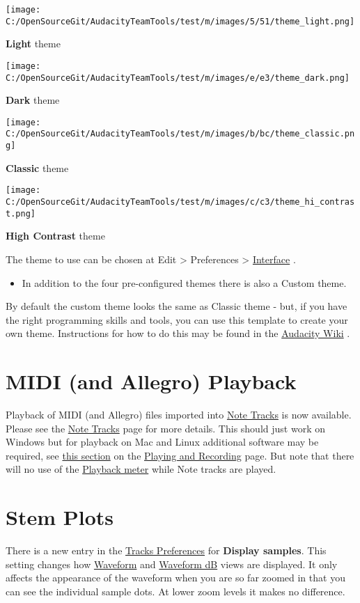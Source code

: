\begin{multicols}{2}
\par \texttt{[image: C:/OpenSourceGit/AudacityTeamTools/test/m/images/5/51/theme\_light.png]}\par 
\textbf{Light} theme

\par \texttt{[image: C:/OpenSourceGit/AudacityTeamTools/test/m/images/e/e3/theme\_dark.png]}\par 
\textbf{Dark} theme

\par \texttt{[image: C:/OpenSourceGit/AudacityTeamTools/test/m/images/b/bc/theme\_classic.png]}\par 
\textbf{Classic} theme

\par \texttt{[image: C:/OpenSourceGit/AudacityTeamTools/test/m/images/c/c3/theme\_hi\_contrast.png]}\par 
\textbf{High Contrast} theme


The theme to use can be chosen at Edit > Preferences > 
\hyperref[XXX\foo{interface_preferences_}]{Interface}
.  

\begin{itemize}
\item  In addition to the four pre-configured themes there is also a Custom theme.  
\end{itemize}
 By default the custom theme looks the same as Classic theme - but, if you have the right programming skills and tools, you can use this template to create your own theme.  Instructions for how to do this may be found in the 
\hyperref[XXX\foo{https:__wiki.audacityteam.org_wiki_Theming_HowTo}]{Audacity Wiki}
.
\section{MIDI (and Allegro) Playback}Playback of MIDI (and Allegro) files imported into 
\hyperref[XXX\foo{note_tracks_}]{Note Tracks}
 is now available.  Please see the 
\hyperref[XXX\foo{note_tracks_}]{Note Tracks}
 page for more details.
This should just work on Windows but for playback on Mac and Linux additional software may be required, see 
\hyperref[XXX\foo{playing_and_recording__midi}]{this section}
 on the 
\hyperref[XXX\foo{playing_and_recording_}]{Playing and Recording}
 page.
But note that there will no use of the 
\hyperref[XXX\foo{meter_toolbar__playback}]{Playback meter}
 while Note tracks are played. 

\section{Stem Plots}There is a new entry in the 
\hyperref[XXX\foo{tracks_preferences_}]{Tracks Preferences}
 for \textbf{Display samples}.  This setting changes how 
\hyperref[XXX\foo{audacity_waveform_}]{Waveform}
 and 
\hyperref[XXX\foo{audacity_waveform__db}]{Waveform dB}
 views are displayed.  It only affects the appearance of the waveform when you are so far zoomed in that you can see the individual sample dots.  At lower zoom levels it makes no difference.  


\end{multicols}
